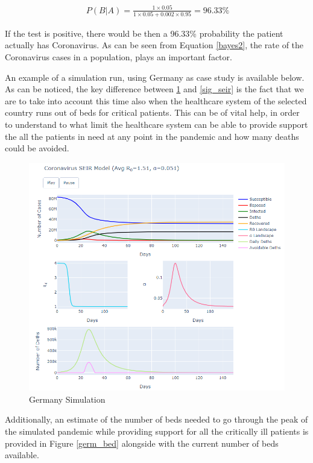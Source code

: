 \useshortskip
\begin{align}
\ P(B|A) = \frac{1 \times 0.05}{1 \times 0.05 + 0.002 \times 0.95} = 96.33\%
\end{align}
\useshortskip

If the test is positive, there would be then a 96.33\% probability the patient actually has Coronavirus. As can be seen from Equation \ref{bayes2}, the rate of the Coronavirus cases in a population, plays an important factor.

An example of a simulation run, using Germany as case study is available below. As can be noticed, the key difference between \ref{germ_sim} and \ref{sig_seir} is the fact that we are to take into account this time also when the healthcare system of the selected country runs out of beds for critical patients. This can be of vital help, in order to understand to what limit the healthcare system can be able to provide support the all the patients in need at any point in the pandemic and how many deaths could be avoided.
 
\begin{figure}[ht!]%
    \centering
    \includegraphics[width=13cm]{latex/images/cov_g2.PNG}%
    \caption{Germany Simulation}
    \label{germ_sim}
\end{figure}

Additionally, an estimate of the number of beds needed to go through the peak of the simulated pandemic while providing support for all the critically ill patients is provided in Figure \ref{germ_bed} alongside with the current number of beds available.

